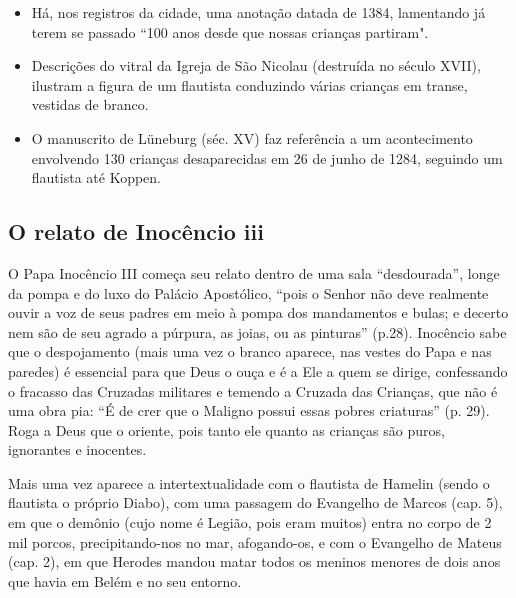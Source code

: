 \documentclass[12pt]{extarticle}
\begin{document}
\begin{itemize}
\item
  Há, nos registros da cidade, uma anotação datada de 1384, lamentando
  já terem se passado ``100 anos desde que nossas crianças partiram".
\end{itemize}

\begin{quote}

\end{quote}

\begin{itemize}
\item
  Descrições do vitral da Igreja de São Nicolau (destruída no século
  XVII), ilustram a figura de um flautista conduzindo várias crianças em
  transe, vestidas de branco.
\end{itemize}

\begin{itemize}
\item
  O manuscrito de Lüneburg (séc. XV) faz referência a um acontecimento
  envolvendo 130 crianças desaparecidas em 26 de junho de 1284, seguindo
  um flautista até Koppen.
\end{itemize}

\subsection{O relato de Inocêncio iii}

O Papa Inocêncio III começa seu relato dentro de uma sala
``desdourada'', longe da pompa e do luxo do Palácio Apostólico, ``pois o
Senhor não deve realmente ouvir a voz de seus padres em meio à pompa dos
mandamentos e bulas; e decerto nem são de seu agrado a púrpura, as
joias, ou as pinturas'' (p.28). Inocêncio sabe que o despojamento (mais
uma vez o branco aparece, nas vestes do Papa e nas paredes) é essencial
para que Deus o ouça e é a Ele a quem se dirige, confessando o fracasso
das Cruzadas militares e temendo a Cruzada das Crianças, que não é uma
obra pia: ``É de crer que o Maligno possui essas pobres criaturas'' (p.
29). Roga a Deus que o oriente, pois tanto ele quanto as crianças são
puros, ignorantes e inocentes.




Mais uma vez aparece a intertextualidade com o flautista de Hamelin
(sendo o flautista o próprio Diabo), com uma passagem do Evangelho de
Marcos (cap. 5), em que o demônio (cujo nome é Legião, pois eram muitos)
entra no corpo de 2 mil porcos, precipitando-nos no mar, afogando-os, e
com o Evangelho de Mateus (cap. 2), em que Herodes mandou matar todos os
meninos menores de dois anos que havia em Belém e no seu entorno.
\end{document}
